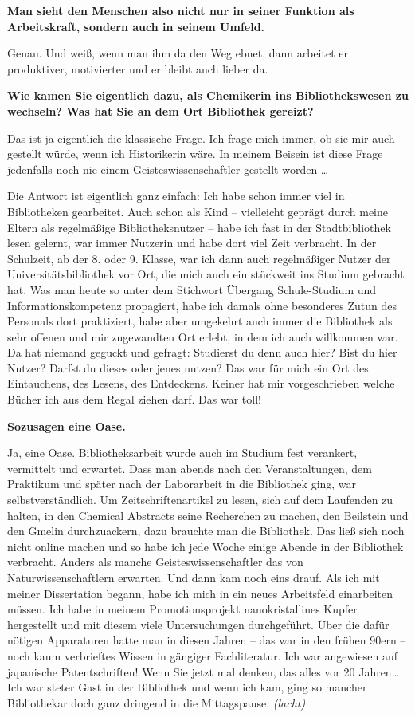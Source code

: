 \documentclass[a4paper,
fontsize=11pt,
oneside,
numbers=noperiodatend,
parskip=half-,
bibliography=totoc,
final
]{scrartcl}
\begin{document}
\textbf{Man sieht den Menschen also nicht nur in seiner Funktion als
Arbeitskraft, sondern auch in seinem Umfeld.}

Genau. Und weiß, wenn man ihm da den Weg ebnet, dann arbeitet er
produktiver, motivierter und er bleibt auch lieber da.

\textbf{Wie kamen Sie eigentlich dazu, als Chemikerin ins
Bibliothekswesen zu wechseln? Was hat Sie an dem Ort Bibliothek
gereizt?}

Das ist ja eigentlich die klassische Frage. Ich frage mich immer, ob sie
mir auch gestellt würde, wenn ich Historikerin wäre. In meinem Beisein
ist diese Frage jedenfalls noch nie einem Geisteswissenschaftler
gestellt worden \ldots{}

Die Antwort ist eigentlich ganz einfach: Ich habe schon immer viel in
Bibliotheken gearbeitet. Auch schon als Kind -- vielleicht geprägt durch
meine Eltern als regelmäßige Bibliotheksnutzer -- habe ich fast in der
Stadtbibliothek lesen gelernt, war immer Nutzerin und habe dort viel
Zeit verbracht. In der Schulzeit, ab der 8. oder 9. Klasse, war ich dann
auch regelmäßiger Nutzer der Universitätsbibliothek vor Ort, die mich
auch ein stückweit ins Studium gebracht hat. Was man heute so unter dem
Stichwort Übergang Schule-Studium und Informationskompetenz propagiert,
habe ich damals ohne besonderes Zutun des Personals dort praktiziert,
habe aber umgekehrt auch immer die Bibliothek als sehr offenen und mir
zugewandten Ort erlebt, in dem ich auch willkommen war. Da hat niemand
geguckt und gefragt: Studierst du denn auch hier? Bist du hier Nutzer?
Darfst du dieses oder jenes nutzen? Das war für mich ein Ort des
Eintauchens, des Lesens, des Entdeckens. Keiner hat mir vorgeschrieben
welche Bücher ich aus dem Regal ziehen darf. Das war toll!

\textbf{Sozusagen eine Oase.}

Ja, eine Oase. Bibliotheksarbeit wurde auch im Studium fest verankert,
vermittelt und erwartet. Dass man abends nach den Veranstaltungen, dem
Praktikum und später nach der Laborarbeit in die Bibliothek ging, war
selbstverständlich. Um Zeitschriftenartikel zu lesen, sich auf dem
Laufenden zu halten, in den Chemical Abstracts seine Recherchen zu
machen, den Beilstein und den Gmelin durchzuackern, dazu brauchte man
die Bibliothek. Das ließ sich noch nicht online machen und so habe ich
jede Woche einige Abende in der Bibliothek verbracht. Anders als manche
Geisteswissenschaftler das von Naturwissenschaftlern erwarten. Und dann
kam noch eins drauf. Als ich mit meiner Dissertation begann, habe ich
mich in ein neues Arbeitsfeld einarbeiten müssen. Ich habe in meinem
Promotionsprojekt nanokristallines Kupfer hergestellt und mit diesem
viele Untersuchungen durchgeführt. Über die dafür nötigen Apparaturen
hatte man in diesen Jahren -- das war in den frühen 90ern -- noch kaum
verbrieftes Wissen in gängiger Fachliteratur. Ich war angewiesen auf
japanische Patentschriften! Wenn Sie jetzt mal denken, das alles vor 20
Jahren\ldots{} Ich war steter Gast in der Bibliothek und wenn ich kam,
ging so mancher Bibliothekar doch ganz dringend in die Mittagspause.
\emph{(lacht)}
\end{document}
